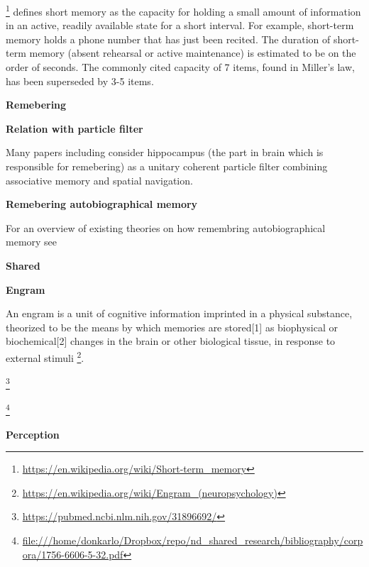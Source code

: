 \documentclass{book}
\providecommand{\ProjectDeepHeading}[2]{%
    \par\medskip\noindent\textbf{#2}\par\smallskip
}
\providecommand{\seeherefooter}[1]{\footnote{\url{#1}}}
\begin{document}
\seeherefooter{https://en.wikipedia.org/wiki/Short-term_memory} defines short memory as the capacity for holding a small amount of information in an active, readily available state for a short interval. For example, short-term memory holds a phone number that has just been recited. The duration of short-term memory (absent rehearsal or active maintenance) is estimated to be on the order of seconds. The commonly cited capacity of 7 items, found in Miller's law, has been superseded by 3-5 items.

\ProjectDeepHeading{5}{Remebering}


\ProjectDeepHeading{8}{Relation with particle filter}
        Many papers including \cite{fox-2010-learning-in-a-unitary-coherent-hippocampus} consider hippocampus (the part in brain which is responsible for remebering) as a unitary coherent particle filter combining associative memory and spatial navigation.
    
    
    \ProjectDeepHeading{8}{Remebering autobiographical memory}
        For an overview of existing theories on how remembring autobiographical memory see \cite{sheldon-2019-a-neurocognitive-perspective-on-the-forms-and-functions-of-autobiographical-memory-retrieval}

\ProjectDeepHeading{5}{Shared}

\ProjectDeepHeading{6}{Engram}


An engram is a unit of cognitive information imprinted in a physical substance, theorized to be the means by which memories are stored[1] as biophysical or biochemical[2] changes in the brain or other biological tissue, in response to external stimuli \seeherefooter{https://en.wikipedia.org/wiki/Engram_(neuropsychology)}.
    
    \seeherefooter{https://pubmed.ncbi.nlm.nih.gov/31896692/}
    
    \seeherefooter{file:///home/donkarlo/Dropbox/repo/nd_shared_research/bibliography/corpora/1756-6606-5-32.pdf}
    
    \cite{sakaguchi-2012-catching-the-engram-strategies-to-examine-the-memory-trace}

\ProjectDeepHeading{3}{Perception}

\end{document}
